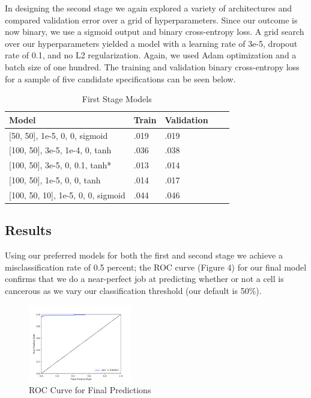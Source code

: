 \documentclass[10.5pt, oneside, twocolumn]{article}   	%
\begin{document}
In designing the second stage we again explored a variety of architectures and compared validation error over a grid of hyperparameters. Since our outcome is now binary, we use a sigmoid output and binary cross-entropy loss. A grid search over our hyperparameters yielded a model with a learning rate of 3e-5, dropout rate of 0.1, and no L2 regularization. Again, we used Adam optimization and a batch size of one hundred. The training and validation binary cross-entropy loss for a sample of five candidate specifications can be seen below. 

\begin{table}[h]
\centering
\caption{First Stage Models}
\label{my-label}
\begin{tabular}{@{}lllll@{}}
\toprule
Model & Train & Validation &  \\ \midrule
{[}50, 50{]}, 1e-5, 0, 0, sigmoid         & .019           & .019    \\
{[}100, 50{]}, 3e-5, 1e-4, 0, tanh      & .036          & .038   \\
{[}100, 50{]}, 3e-5, 0, 0.1, tanh*    & .013          & .014  \\
{[}100, 50{]}, 1e-5, 0, 0, tanh       & .014         & .017     \\
{[}100, 50, 10{]}, 1e-5, 0, 0, sigmoid    & .044         & .046    
\end{tabular}
\end{table}\textit{}

\subsection{Results}
Using our preferred models for both the first and second stage we achieve a misclassification rate of 0.5 percent; the ROC curve (Figure 4) for our final model confirms that we do a near-perfect job at predicting whether or not a cell is cancerous as we vary our classification threshold (our default  is 50\%). 


\begin{figure}[h!]
	\caption{ROC Curve for Final Predictions}
	\centering
	\includegraphics[width=0.4\textwidth]{roc_curve.png}
\end{figure}
\end{document}
